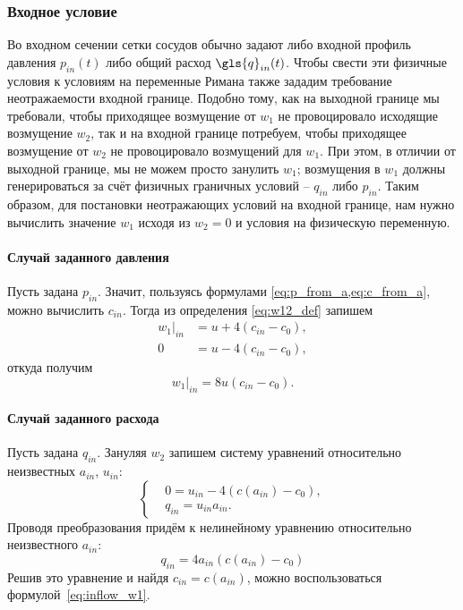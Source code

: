 \subsubsection{Входное условие}
Во входном сечении сетки сосудов обычно задают либо входной профиль давления $p_{in}(t)$
либо общий расход $\gls{q}_{in}(t)$. Чтобы свести
эти физичные условия к условиям на переменные Римана также зададим требование неотражаемости входной границе.
Подобно тому, как на выходной границе мы требовали, чтобы приходящее возмущение от $w_1$ не
провоцировало исходящие возмущение $w_2$, так и на входной границе потребуем, чтобы
приходящее возмущение от $w_2$ не провоцировало возмущений для $w_1$.
При этом, в отличии от выходной границе, мы не можем просто занулить $w_1$;
возмущения в $w_1$ должны генерироваться за счёт физичных граничных условий -- $q_{in}$ либо $p_{in}$.
Таким образом, для постановки неотражающих условий на входной границе, нам нужно вычислить значение $w_1$
исходя из $w_2 = 0$ и условия на физическую переменную.

\paragraph{Случай заданного давления} Пусть задана $p_{in}$. Значит, пользуясь формулами \cref{eq:p_from_a,eq:c_from_a},
можно вычислить $c_{in}$. Тогда из определения \cref{eq:w12_def} запишем
\begin{equation}
\nonumber
\begin{aligned}
\left.w_1\right|_{in} &= u + 4(c_{in} - c_0), \\
0 &= u - 4(c_{in} - c_0),
\end{aligned}
\end{equation}
откуда получим
\begin{equation}
\label{eq:inflow_w1}
\left.w_1\right|_{in} = 8u(c_{in} - c_0).
\end{equation}


\paragraph{Случай заданного расхода} Пусть задана $q_{in}$.
Зануляя $w_2$ запишем систему уравнений относительно неизвестных $a_{in}$, $u_{in}$:
\begin{equation}
\nonumber
\left\{
\begin{aligned}
& 0   =  u_{in} - 4(c(a_{in}) - c_0),\\
& q_{in} = u_{in} a_{in}.
\end{aligned}
\right.
\end{equation}
Проводя преобразования придём к нелинейному уравнению относительно неизвестного $a_{in}$:
\begin{equation}
\nonumber
q_{in} = 4a_{in}\left(c(a_{in}) - c_0\right)
\end{equation}
Решив это уравнение и найдя $c_{in} = c(a_{in})$, можно воспользоваться формулой~\cref{eq:inflow_w1}.


